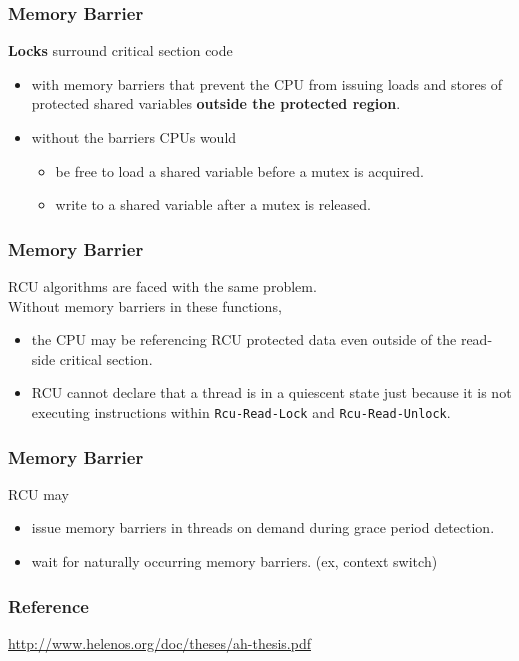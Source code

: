 \documentclass{beamer}
\begin{document}

\begin{frame}[t]
  \frametitle{Memory Barrier}
  \textbf{Locks} surround critical section code
  \begin{itemize}
  \item with memory barriers that prevent
    the CPU from issuing loads and stores of protected shared variables \textbf{outside
      the protected region}.
  \item without the barriers CPUs would
    \begin{itemize}
    \item be free to load a shared variable before a mutex is acquired.
    \item write to a shared variable after a mutex is released.
    \end{itemize}
  \end{itemize}
  
\end{frame}


\begin{frame}[t]
  \frametitle{Memory Barrier}
  RCU algorithms are faced with the same problem.\\

  Without memory barriers in these functions,
  \begin{itemize}
  \item the CPU may be referencing RCU protected data even outside of the read-side critical
    section.
  \item RCU cannot declare that a thread is in a quiescent state just because it is not
    executing instructions within \texttt{Rcu-Read-Lock} and \texttt{Rcu-Read-Unlock}.
  \end{itemize}

\end{frame}


\begin{frame}[t]
  \frametitle{Memory Barrier}
  RCU may
  \begin{itemize}
  \item issue memory barriers in threads on demand during grace period detection.
  \item wait for naturally occurring memory barriers. (ex, context switch)
  \end{itemize}
  
\end{frame}


\begin{frame}[t]
  \frametitle{Reference}

  \begin{center}
    \url{http://www.helenos.org/doc/theses/ah-thesis.pdf}
  \end{center}
 
\end{frame}
\end{document}
